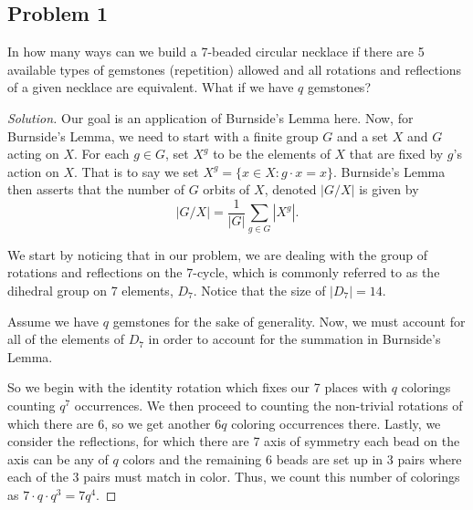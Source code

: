 \documentclass[12pt]{amsart}
\newenvironment{solution}
{\begin{proof}[Solution]}
{\end{proof}}
\begin{document}
    \newcommand{\drawtetraE}[7]{%
    \begin{scope}[xshift=#1]
      \coordinate (T) at (0,1.3);
      \coordinate (L) at (-1.0,0);
      \coordinate (R) at (1.0,0);
      \coordinate (B) at (0,-0.55);
      \tetraEdges{#2}{#3}{#4}{#5}{#6}{#7}
      \fill (T) circle (1.7pt);
      \fill (L) circle (1.7pt);
      \fill (R) circle (1.7pt);
      \fill (B) circle (1.7pt);
    \end{scope}
    }
    \maketitle
    \date{\today}
    \begin{onehalfspace}
        \section{Problem 1}
        In how many ways can we build a 7-beaded circular necklace if there are 5 available types of gemstones
        (repetition) allowed and all rotations  and reflections of a given necklace are equivalent.
        What if we have $q$ gemstones?

        \begin{solution}
            Our goal is an application of Burnside's Lemma here.
            Now, for Burnside's Lemma, we need to start
            with a finite group $G$ and a set $X$ and $G$ acting on $X$.
            For each $g\in G$, set $X^g$ to be the elements of $X$ that are fixed by $g$'s action on $X$.
            That is to say we set $X^g = \{x\in X: g\cdot x = x\}$.
            Burnside's Lemma then asserts that the number of $G$ orbits of $X$, denoted $|G/X|$ is given by
            \[
                |G/ X| = \frac{1}{|G|}\sum_{g\in G} |X^g|.
            \]

            We start by noticing that in our problem, we are dealing with the group of rotations and reflections
            on the 7-cycle, which is commonly referred to as the dihedral group on 7 elements, $D_7$.
            Notice that the size of $|D_7|=14$.

            Assume we have $q$ gemstones for the sake of generality.
            Now, we must account for all of the elements of $D_7$ in order to account for the summation in Burnside's
            Lemma.

            So we begin with the identity rotation which fixes our 7 places with $q$ colorings counting $q^7$ occurrences.
            We then proceed to counting the non-trivial rotations of which there are 6, so we get another $6q$ coloring
            occurrences there.
            Lastly, we consider the reflections, for which there are 7 axis of symmetry each bead on the axis can be
            any of $q$ colors and the remaining 6 beads are set up in 3 pairs where each of the 3 pairs must match in color.
            Thus, we count this number of colorings as $7\cdot q\cdot q^3=7q^4$.


\end{solution}
\end{onehalfspace}
\end{document}
